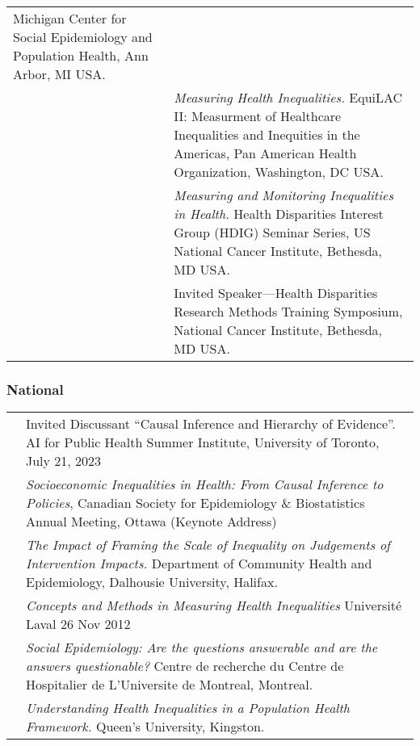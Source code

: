 \documentclass[
  letterpaper,
  DIV=11,
  numbers=noendperiod]{scrartcl}
\begin{document}
\begin{longtable}[]{@{}
  >{\raggedright\arraybackslash}p{}
  >{\raggedright\arraybackslash}p{}@{}}
Michigan Center for Social Epidemiology and Population Health, Ann
Arbor, MI USA. \\
2009 & \emph{Measuring Health Inequalities.} EquiLAC II: Measurment of
Healthcare Inequalities and Inequities in the Americas, Pan American
Health Organization, Washington, DC USA. \\
2008 & \emph{Measuring and Monitoring Inequalities in Health.} Health
Disparities Interest Group (HDIG) Seminar Series, US National Cancer
Institute, Bethesda, MD USA. \\
2006 & Invited Speaker---Health Disparities Research Methods Training
Symposium, National Cancer Institute, Bethesda, MD USA. \\
\end{longtable}

\hypertarget{national}{%
\subsubsection{National}\label{national}}

\begin{longtable}[]{@{}
  >{\raggedright\arraybackslash}p{}
  >{\raggedright\arraybackslash}p{}@{}}
\toprule\noalign{}
\endhead
\bottomrule\noalign{}
\endlastfoot
2023 & Invited Discussant ``Causal Inference and Hierarchy of
Evidence''. AI for Public Health Summer Institute, University of
Toronto, July 21, 2023 \\
2019 & \emph{Socioeconomic Inequalities in Health: From Causal Inference
to Policies}, Canadian Society for Epidemiology \& Biostatistics Annual
Meeting, Ottawa (Keynote Address) \\
2013 & \emph{The Impact of Framing the Scale of Inequality on Judgements
of Intervention Impacts.} Department of Community Health and
Epidemiology, Dalhousie University, Halifax. \\
2012 & \emph{Concepts and Methods in Measuring Health Inequalities}
Université Laval 26 Nov 2012 \\
2011 & \emph{Social Epidemiology: Are the questions answerable and are
the answers questionable?} Centre de recherche du Centre de Hospitalier
de L'Universite de Montreal, Montreal. \\
2008 & \emph{Understanding Health Inequalities in a Population Health
Framework.} Queen's University, Kingston. \\
\end{longtable}
\end{document}
